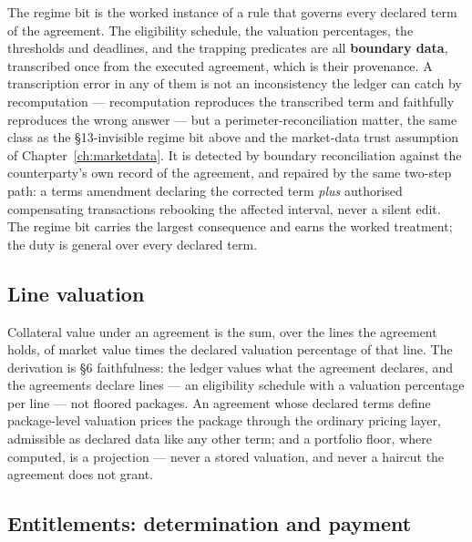 \medskip
The regime bit is the worked instance of a rule that governs every declared term of the
agreement. The eligibility schedule, the valuation percentages, the thresholds and
deadlines, and the trapping predicates are all \textbf{boundary data}, transcribed once
from the executed agreement, which is their provenance. A transcription error in any of
them is not an inconsistency the ledger can catch by recomputation --- recomputation
reproduces the transcribed term and faithfully reproduces the wrong answer --- but a
perimeter-reconciliation matter, the same class as the \S13-invisible regime bit above
and the market-data trust assumption of Chapter~\ref{ch:marketdata}. It is detected by
boundary reconciliation against the counterparty's own record of the agreement, and
repaired by the same two-step path: a terms amendment declaring the corrected term
\emph{plus} authorised compensating transactions rebooking the affected interval, never a silent
edit. The regime bit carries the largest consequence and earns the worked treatment;
the duty is general over every declared term.

\subsection{Line valuation}

Collateral value under an agreement is the sum, over the lines the agreement
holds, of market value times the declared valuation percentage of that line.
The derivation is \S6 faithfulness: the ledger values what the agreement
declares, and the agreements declare lines --- an eligibility schedule with a
valuation percentage per line --- not floored packages. An agreement whose
declared terms define package-level valuation prices the package through the
ordinary pricing layer, admissible as declared data like any other term; and a
portfolio floor, where computed, is a projection --- never a stored valuation,
and never a haircut the agreement does not grant.

\subsection{Entitlements: determination and payment}

